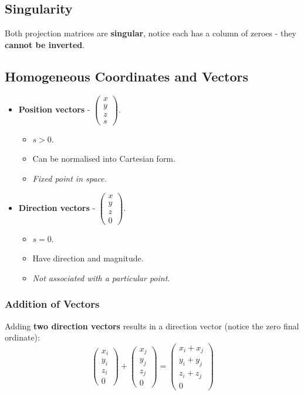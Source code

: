 \documentclass[11pt]{article}
\begin{document}
\subsection{Singularity}
Both projection matrices are \textbf{singular}, notice each has a column of zeroes - they \textbf{cannot be inverted}.

\subsection{Homogeneous Coordinates and Vectors}
\begin{itemize}
  \item \textbf{Position vectors} - $\begin{pmatrix} x \\ y \\ z \\ s \end{pmatrix}$.
    \begin{itemize}
      \item $s > 0$.
      \item Can be normalised into Cartesian form.
      \item \textit{Fixed point in space.}
    \end{itemize}
  \item \textbf{Direction vectors} - $\begin{pmatrix} x \\ y \\ z \\ 0 \end{pmatrix}$.
    \begin{itemize}
      \item $s = 0$.
      \item Have direction and magnitude.
      \item \textit{Not associated with a particular point.}
    \end{itemize}
\end{itemize}

\subsubsection{Addition of Vectors}
Adding \textbf{two direction vectors} results in a direction vector (notice the zero final ordinate):
\[
  \begin{pmatrix} x_i \\ y_i \\ z_i \\ 0 \end{pmatrix} 
  +
  \begin{pmatrix} x_j \\ y_j \\ z_j \\ 0 \end{pmatrix} 
  =
  \begin{pmatrix} x_i + x_j \\ y_i + y_j \\ z_i + z_j \\ 0 \end{pmatrix} 
\]
\end{document}
